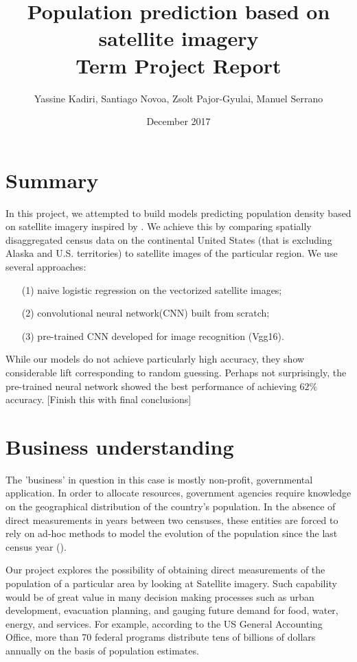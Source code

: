 \documentclass{article}
\begin{document}
\title{Population prediction based on satellite imagery\\
Term Project Report} 

\date{December 2017}
\author{Yassine Kadiri, Santiago Novoa, Zsolt Pajor-Gyulai, Manuel Serrano}
\maketitle

\doublespacing


\section{Summary}
In this project, we attempted to build models predicting population density based on satellite imagery inspired by \cite{RHD17}. We achieve this by comparing spatially disaggregated census data on the continental United States (that is excluding Alaska and U.S. territories) to satellite images of the particular region. We use several approaches: 
\begin{itemize}
\item[(1)] naive logistic regression on the vectorized satellite images; 
\item[(2)] convolutional neural network(CNN) built from scratch; \item[(3)] pre-trained CNN developed for image recognition (Vgg16).
\end{itemize}

While our models do not achieve particularly high accuracy, they show considerable lift corresponding to random guessing. Perhaps not surprisingly, the pre-trained neural network showed the best performance of achieving $62\%$ accuracy. [Finish this with final conclusions]

\section{Business understanding}
The 'business' in question in this case is mostly non-profit, governmental application. In order to allocate resources, government agencies require knowledge on the geographical distribution of the country's population. In the absence of direct measurements in years between two censuses, these entities are forced to rely on ad-hoc methods to model the evolution of the population since the last census year (\cite{L96}).

Our project explores the possibility of obtaining direct measurements of the population of a particular area by looking at Satellite imagery. Such capability would be of great value in many decision making processes such as urban development, evacuation planning, and gauging future demand for food, water, energy, and services. For example, according to the US General Accounting Office, more than 70 federal programs distribute tens of billions of dollars annually on the basis of population estimates.
\end{document}
